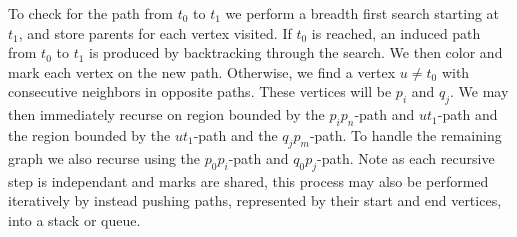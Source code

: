 \documentclass[11pt,letter]{article}
\begin{document}
\noindent To check for the path from $t_0$ to $t_1$ we perform a
breadth first search starting at $t_1$, and store parents for each vertex visited. If $t_0$ is reached, an induced path from $t_0$ 
to $t_1$ is produced by backtracking through the search. We then color and mark each vertex on the new path.
Otherwise, we find a vertex $u\ne t_0$ with consecutive neighbors in opposite paths. These vertices
will be $p_i$ and $q_j$. We may then immediately recurse on region bounded by the $p_ip_n$-path and $ut_1$-path
and the region bounded by the $ut_1$-path and the $q_jp_m$-path. To handle the remaining graph we also recurse
using the $p_0p_i$-path and $q_0p_j$-path. Note as each recursive step is independant and marks are shared,
this process may also be performed iteratively by instead pushing paths, represented by their start and end vertices,
into a stack or queue.
\end{document}
